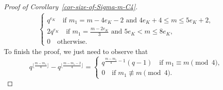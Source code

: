 \documentclass[11pt]{amsart}
\theoremstyle{theorem}
\theoremstyle{example}
\theoremstyle{definition}
\numberwithin{theorem}{section}
\numberwithin{theorem}{section}
\begin{document}
\begin{proof}[Proof of Corollary~\ref{cor-size-of-Sigma-m-C4}]
\begin{align*}
\begin{cases}
        \\
        q^{e_K}\quad\text{if $m_1 = m - 4e_K - 2$ and $4e_K + 4 \leq m \leq 5e_K + 2$},
        \\
        2q^{e_K}\quad\text{if $m_1 = \frac{m - 2e_K}{3}$ and $5e_K < m \leq 8e_K$},
        \\
        0 \quad\text{otherwise}.
    \end{cases}
\end{align*}
To finish the proof, we just need to observe that
$$
q^{\lfloor \frac{m - m_1}{4}\rfloor} - q^{\lfloor \frac{m - m_1 - 2}{4}\rfloor}  = \begin{cases}
    q^{\frac{m-m_1}{4} - 1}(q - 1)\quad\text{if $m_1\equiv m\pmod{4}$},
    \\
    0 \quad\text{if $m_1 \not \equiv m \pmod{4}$}.
\end{cases}
$$
\end{proof}
\end{document}
